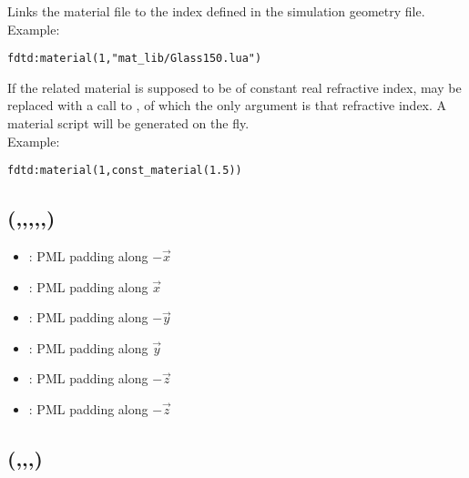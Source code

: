 \label{fdtd_fc_material}
Links the material file  to the index  defined in the simulation geometry file.\\
	Example:
\begin{lstlisting}
fdtd:material(1,"mat_lib/Glass150.lua")
\end{lstlisting}

If the related material is supposed to be of constant real refractive index,  may be replaced with a call to , of which the only argument is that refractive index. A material script will be generated on the fly.\\
	Example:
\begin{lstlisting}
fdtd:material(1,const_material(1.5))
\end{lstlisting}

%

\subsection[padding]{(,,,,,)}

\fwarn
\begin{itemize}
	\item {}: PML padding along $-\vec x$
	\item {}: PML padding along $\vec x$
	\item {}: PML padding along $-\vec y$
	\item {}: PML padding along $\vec y$
	\item {}: PML padding along $-\vec z$
	\item {}: PML padding along $-\vec z$
\end{itemize}

\subsection[pml\_X]{(,,,)}

